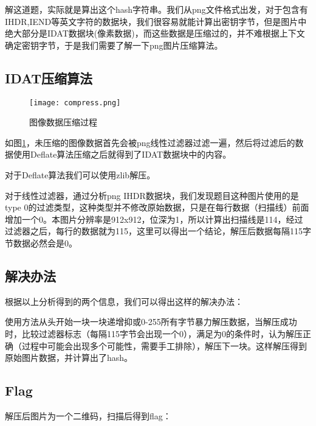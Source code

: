 \documentclass[a4paper,UTF8]{ctexart}
\begin{document}
  解这道题，实际就是算出这个hash字符串。我们从png文件格式出发，对于包含有IHDR,IEND等英文字符的数据块，我们很容易就能计算出密钥字节，但是图片中绝大部分是IDAT数据块(像素数据)，而这些数据是压缩过的，并不难根据上下文确定密钥字节，于是我们需要了解一下png图片压缩算法。

\subsection{IDAT压缩算法}

  \begin{figure}[H]
    \centering
    \texttt{[image: compress.png]}
    \caption{图像数据压缩过程}\label{compress}
  \end{figure}

  如图\ref{compress}，未压缩的图像数据首先会被png线性过滤器过滤一遍，然后将过滤后的数据使用Deflate算法压缩之后就得到了IDAT数据块中的内容。

  对于Deflate算法我们可以使用zlib解压。

  对于线性过滤器，通过分析png IHDR数据块，我们发现题目这种图片使用的是type 0的过滤类型，这种类型并不修改原始数据，只是在每行数据（扫描线）前面增加一个0。本图片分辨率是912x912，位深为1，所以计算出扫描线是114，经过过滤器之后，每行的数据就为115，这里可以得出一个结论，解压后数据每隔115字节数据必然会是0。

\subsection{解决办法}

  根据以上分析得到的两个信息，我们可以得出这样的解决办法：

  使用方法从头开始一块一块递增抑或0-255所有字节暴力解压数据，当解压成功时，比较过滤器标志（每隔115字节会出现一个0），满足为0的条件时，认为解压正确（过程中可能会出现多个可能性，需要手工排除），解压下一块。这样解压得到原始图片数据，并计算出了hash。

\subsection{Flag}

  解压后图片为一个二维码，扫描后得到flag：
  
\end{document}
